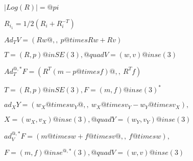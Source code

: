 \documentclass{article}
\begin{document}
$|Log(R)| = @pi$
\pagebreak

$R_{i_1}=1/2(R_i + R_i^{-T})$
\pagebreak

$Ad_TV = ( Rw@,, ~p @times Rw + Rv)$
\pagebreak

$T=(R,p)@in SE(3), @quad V=(w,v)@in se(3) $
\pagebreak

$Ad^{@,*}_TF = ( R^T (m - p@times f)@,,~ R^T f)$
\pagebreak

$T=(R,p)@in SE(3), F=(m,f)@in se(3)^*$
\pagebreak

$ad_X Y = ( w_X @times w_Y@,,~w_X @times v_Y - w_Y @times v_X),$
\pagebreak

$X=(w_X,v_X)@in se(3), @quad Y=(w_Y,v_Y)@in se(3) $
\pagebreak

$ad^{@,*}_V F = (m @times w + f @times v@,,~ f @times w),$
\pagebreak

$F=(m,f)@in se^{@,*}(3), @quad V=(w,v)@in se(3) $
\pagebreak
\end{document}
